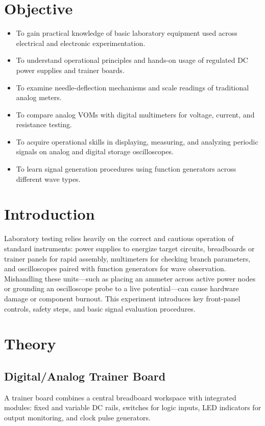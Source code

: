 \section{Objective}
\begin{itemize}
	\item To gain practical knowledge of basic laboratory equipment used across electrical and electronic experimentation.
	\item To understand operational principles and hands-on usage of regulated DC power supplies and trainer boards.
	\item To examine needle-deflection mechanisms and scale readings of traditional analog meters.
	\item To compare analog VOMs with digital multimeters for voltage, current, and resistance testing.
	\item To acquire operational skills in displaying, measuring, and analyzing periodic signals on analog and digital storage oscilloscopes.
	\item To learn signal generation procedures using function generators across different wave types.
\end{itemize}

\section{Introduction}
Laboratory testing relies heavily on the correct and cautious operation of standard instruments: power supplies to energize target circuits, breadboards or trainer panels for rapid assembly, multimeters for checking branch parameters, and oscilloscopes paired with function generators for wave observation. Mishandling these units—such as placing an ammeter across active power nodes or grounding an oscilloscope probe to a live potential—can cause hardware damage or component burnout. This experiment introduces key front-panel controls, safety steps, and basic signal evaluation procedures.

\section{Theory}

\subsection{Digital/Analog Trainer Board}
A trainer board combines a central breadboard workspace with integrated modules: fixed and variable DC rails, switches for logic inputs, LED indicators for output monitoring, and clock pulse generators.


